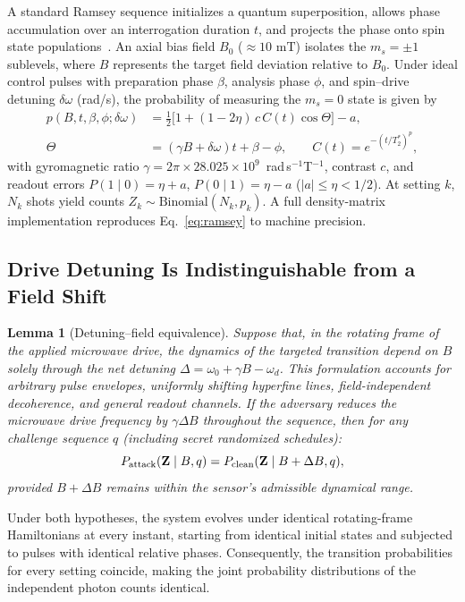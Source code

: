 \documentclass[conference]{IEEEtran}
\newcommand{\Ttwo}{T_2^{\ast}}
\newtheorem{lemma}{Lemma}
\begin{document}
A standard Ramsey sequence initializes a quantum superposition, allows phase accumulation over an interrogation duration $t$, and projects the phase onto spin state populations~\cite{degen2017quantum,taylor2008magnetometer,rondin2014magnetometry}. An axial bias field $B_0$ ($\approx 10\text{~mT}$) isolates the $m_s = \pm 1$ sublevels, where $B$ represents the target field deviation relative to $B_0$. Under ideal control pulses with preparation phase $\beta$, analysis phase $\phi$, and spin--drive detuning $\delta\omega$ (rad/s), the probability of measuring the $m_s=0$ state is given by
\begin{align}
 p(B,t,\beta,\phi;\delta\omega)
 &=\tfrac12\bigl[1+(1-2\eta)\,c\,C(t)\cos\Theta\bigr]-a,\label{eq:ramsey}\\
 \Theta&=(\gamma B+\delta\omega)t+\beta-\phi,\qquad
 C(t)=e^{-(t/\Ttwo)^p},\nonumber
\end{align}
with gyromagnetic ratio $\gamma=2\pi\times28.025\times10^9$~rad\,s$^{-1}$T$^{-1}$, contrast $c$, and readout errors $P(1\mid0)=\eta+a$, $P(0\mid1)=\eta-a$ ($\vert{}a\vert{}\le\eta<1/2$). At setting $k$, $N_k$ shots yield counts $Z_k\sim\mathrm{Binomial}(N_k,p_k)$. A full density-matrix implementation reproduces Eq.~\eqref{eq:ramsey} to machine precision.

\subsection{Drive Detuning Is Indistinguishable from a Field Shift}

\begin{lemma}[Detuning--field equivalence]\label{lem:equivalence}
Suppose that, in the rotating frame of the applied microwave drive, the dynamics of the targeted transition depend on $B$ solely through the net detuning $\Delta = \omega_0 + \gamma B - \omega_d$. This formulation accounts for arbitrary pulse envelopes, uniformly shifting hyperfine lines, field-independent decoherence, and general readout channels. If the adversary reduces the microwave drive frequency by $\gamma\Delta B$ throughout the sequence, then for any challenge sequence $q$ (including secret randomized schedules):
\begin{equation}
 P_{\rm attack}(\mathbf Z\mid B,q)=P_{\rm clean}(\mathbf Z\mid B+\Delta B,q),
 \label{eq:identity}
\end{equation}
provided $B+\Delta B$ remains within the sensor's admissible dynamical range.
\end{lemma}
\begin{IEEEproof}
Under both hypotheses, the system evolves under identical rotating-frame Hamiltonians at every instant, starting from identical initial states and subjected to pulses with identical relative phases. Consequently, the transition probabilities for every setting coincide, making the joint probability distributions of the independent photon counts identical.
\end{IEEEproof}
\end{document}
